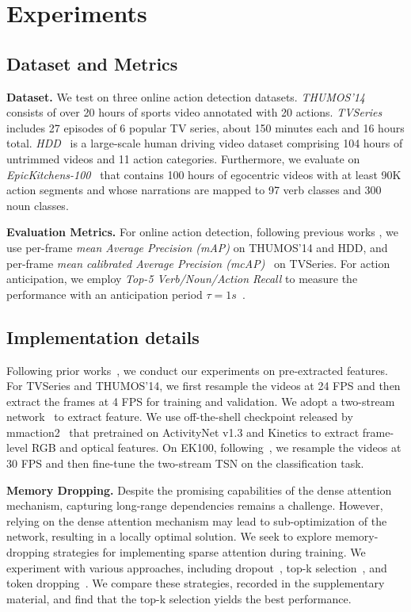 

\section{Experiments}
\label{sec:experiments}

\subsection{Dataset and Metrics}
\textbf{Dataset.} We test on three online action detection datasets. \emph{THUMOS'14}~\cite{THUMOS14} consists of over 20 hours of sports video annotated with 20 actions. \emph{TVSeries}~\cite{oad2016} includes 27 episodes of 6 popular TV series, about 150 minutes each and 16 hours total. \emph{HDD}~\cite{hdd} is a large-scale human driving video dataset comprising 104 hours of untrimmed videos and 11 action categories. Furthermore, we evaluate on \emph{EpicKitchens-100}~\cite{ek100} that contains 100 hours of egocentric videos with at least 90K action segments and whose narrations are mapped to 97 verb classes and 300 noun classes.


\textbf{Evaluation Metrics.} For online action detection, following previous works \cite{oad2016, LAP-Net, oadtr, lstr, colar}, we use per-frame \emph{mean Average Precision (mAP)} on THUMOS'14 and HDD, and per-frame \emph{mean calibrated Average Precision (mcAP)}~\cite{oad2016} on TVSeries. For action anticipation, we employ \emph{Top-5 Verb/Noun/Action Recall}  to measure the performance with an anticipation period $\tau = 1s$~\cite{ek100}.




\subsection{Implementation details} 
Following prior works~\cite{trn, lstr, testra}, we conduct our experiments on pre-extracted features. For TVSeries and THUMOS'14, we first resample the videos at 24 FPS and then extract the frames at 4 FPS for training and validation. We adopt a two-stream network~\cite{tsn} to extract feature.  
We use off-the-shell checkpoint released by mmaction2~\cite{mmaction2} that pretrained on ActivityNet v1.3 \cite{anet} and Kinetics \cite{kinetics} to extract frame-level RGB and optical features. On EK100, following~\cite{rulstm}, we resample the videos at 30 FPS and then fine-tune the two-stream TSN on the classification task.


\textbf{Memory Dropping.}
Despite the promising capabilities of the dense attention mechanism, capturing long-range dependencies remains a challenge.
However, relying on the dense attention mechanism may lead to sub-optimization of the network, resulting in a locally optimal solution. 
We seek to explore memory-dropping strategies for implementing sparse attention during training.
We experiment with various approaches, including dropout~\cite{dropout}, top-k selection~\cite{knn}, and token dropping~\cite{mae}. We compare these strategies, recorded in the supplementary material, and find that the top-k selection yields the best performance.

